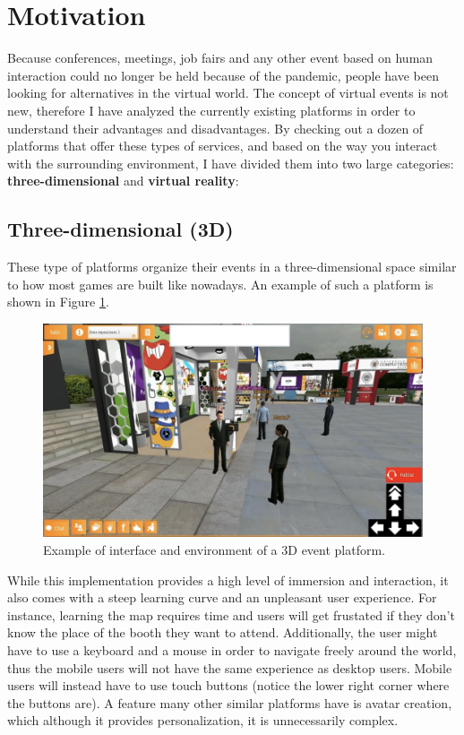 \section*{Motivation}
Because conferences, meetings, job fairs and any other event based on human interaction could no longer be held because of the pandemic, people have been looking for alternatives in the virtual world. The concept of virtual events is not new, therefore I have analyzed the currently existing platforms in order to understand their advantages and disadvantages. By checking out a dozen of platforms that offer these types of services, and based on the way you interact with the surrounding environment, I have divided them into two large categories: \textbf{three-dimensional} and \textbf{virtual reality}:

\subsection*{Three-dimensional (3D)}
These type of platforms organize their events in a three-dimensional space similar to how most games are built like nowadays. An example of such a platform is shown in Figure \ref{figure:motivation-3d}.

\begin{figure}[H]
	\includegraphics[width=\textwidth]{images/virtway_3d_conference.jpg}
	\caption{Example of interface and environment of a 3D event platform.}
	\label{figure:motivation-3d}
\end{figure}

While this implementation provides a high level of immersion and interaction, it also comes with a steep learning curve and an unpleasant user experience. For instance, learning the map requires time and users will get frustated if they don't know the place of the booth they want to attend. Additionally, the user might have to use a keyboard and a mouse in order to navigate freely around the world, thus the mobile users will not have the same experience as desktop users. Mobile users will instead have to use touch buttons (notice the lower right corner where the buttons are). A feature many other similar platforms have is avatar creation, which although it provides personalization, it is unnecessarily complex. \\

